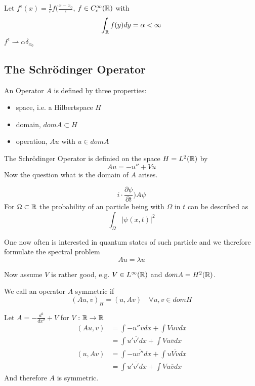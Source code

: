 \begin{example}
	Let $f^{\epsilon}(x) = \frac{1}{\epsilon} f(\frac{x - x_{0}}{\epsilon}$, $f \in C_{c}^{\infty}(\mathbb{R})$ with
		\[ \int_{\mathbb{R}} f(y) dy = \alpha < \infty \]
	$f^{\epsilon} \rightharpoonup \alpha \delta_{x_{0}}$	
\end{example}	

\subsection{The Schrödinger Operator}
An Operator $A$ is defined by three properties:
\begin{itemize}
	\item space, i.e. a Hilbertspace $H$
	\item domain, $dom A \subset H$
	\item operation, $A u$ with $u \in dom A$
\end{itemize}	
	
The Schrödinger Operator	 is definied on the space $H = L^{2}(\mathbb{R})$ by
	\[ A u = - u'' + V u \]
Now the question what is the domain of $A$ arises.

\begin{example}
		\[ i \cdot \frac{\partial \psi}{\partial t} ) A \psi \]
For $\Omega \subset \mathbb{R}$ the probability of an particle being with $\Omega$ in $t$ can be described as
	\[ \int_{\Omega} \left| \psi(x , t) \right|^{2} \]
\end{example}

	
One now often is interested in quantum states of such particle and we therefore formulate the spectral problem
	\[ A u = \lambda u \]
	
Now assume $V$ is rather good, e.g. $V \in L^{\infty}(\mathbb{R})$ and $dom A = H^{2}(\mathbb{R})$.

\begin{definition}
	We call an operator $A$ symmetric if
		\[ ( A u , v )_{H} = (u , A v) \quad \forall u, v \in dom H \]
\end{definition}	

\begin{example}
	Let $A = - \frac{d^{2}}{dx^{2}} + V$ for $V \colon \mathbb{R} \to \mathbb{R}$
	\begin{align*}
		(A u , v ) 	& = \int - u '' \overline{v} dx + \int V u \overline{v} dx \\
					& = \int u' \overline{v'} dx + \int V u \overline{v} dx
	\end{align*}
	\begin{align*}
		( u , A v ) & = \int - u \overline{v ''} dx + \int u \overline{V v} dx \\
					& = \int u' \overline{v'} dx + \int V u \overline{v} dx
	\end{align*}
	And therefore $A$ is symmetric.
\end{example}	

